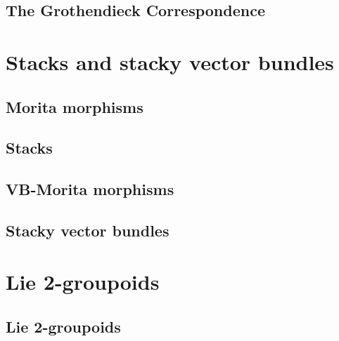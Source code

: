 

\section{The Grothendieck Correspondence}\label{sec:groth-corresp}




\chapter{Stacks and stacky vector bundles}\label{ch:stacks-and-syacky-vb}

\section{Morita morphisms}\label{sec:morita}



\section{Stacks}



\section{VB-Morita morphisms}\label{sec:VB-Morita}



\section{Stacky vector bundles}




\chapter{Lie 2-groupoids}\label{ch:lie-2-gpds}

\section{Lie 2-groupoids}


